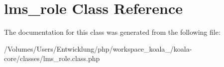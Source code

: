 \hypertarget{classlms__role}{
\section{lms\_\-role Class Reference}
\label{classlms__role}
}


The documentation for this class was generated from the following file:\begin{DoxyCompactItemize}
\item 
/Volumes/Users/Entwicklung/php/workspace\_\-koala\_/koala-\/core/classes/lms\_\-role.class.php\end{DoxyCompactItemize}
